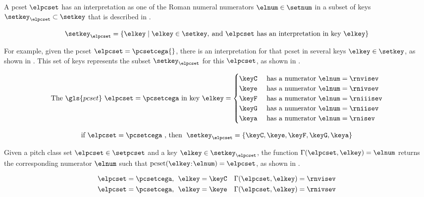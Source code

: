 
A \gls{pcset} $\elpcset$ has an interpretation as one of the
Roman numeral numerators $\elnum \in \setnum$ in a subset of
keys $\setkey_{\elpcset} \subset \setkey$ that is described
in .

\begin{equation}
    \label{eq:keys_for_pcset}
    \setkey_{\elpcset} = \{\elkey \mid \elkey \in \setkey,
     \: \text{and $\elpcset$ has an interpretation in key $\elkey$}\}
\end{equation}

For example, given the \gls{pcset} $\elpcset =
\pcsetcega{}$, there is an interpretation for that
\gls{pcset} in several keys $\elkey \in \setkey$, as shown
in . This set of keys represents the
subset $\setkey_\elpcset$ for this $\elpcset$, as shown in
. 

\begin{equation}
    \label{eq:pcset_cega}
    \text{The } \gls{pcset} \text{ } \elpcset = \pcsetcega \text{ in key } \elkey =
    \begin{cases}
        \keyC & \text{ has a numerator } \elnum = \rnvisev \\
        \keye & \text{ has a numerator } \elnum = \rnivsev \\
        \keyF & \text{ has a numerator } \elnum = \rniiisev \\
        \keyG & \text{ has a numerator } \elnum = \rniisev \\
        \keya & \text{ has a numerator } \elnum = \rnisev \\
    \end{cases}
\end{equation}

\begin{equation}
    \label{eq:keys_for_pcset_example}
    \text{if } \elpcset = \pcsetcega \text{ , then } \; 
    \setkey_{\elpcset} = \{ \keyC, \keye, \keyF, \keyG, \keya \}
\end{equation}

Given a pitch class set $\elpcset \in \setpcset$ and a key
$\elkey \in \setkey_\elpcset$, the function
$\Gamma(\elpcset, \elkey) = \elnum$ returns the
corresponding numerator $\elnum$ such that
$\text{pcset}(\elkey$:$\elnum) = \elpcset$, as shown in
.

\begin{equation}
    \label{eq:numerator_from_pcset_key}
    \begin{split}
        \elpcset = \pcsetcega \text{, } \; \elkey = \keyC \quad \Gamma(\elpcset, \elkey) = \rnvisev \\
        \elpcset = \pcsetcega \text{, } \; \elkey = \keye \quad \Gamma(\elpcset, \elkey) = \rnivsev \\
    \end{split}
\end{equation}


